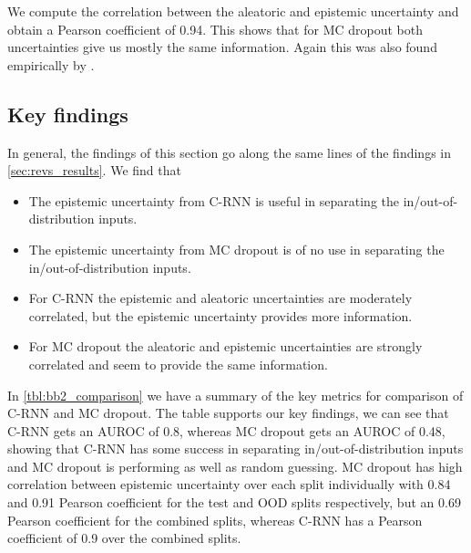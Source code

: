 We compute the correlation between the aleatoric and epistemic uncertainty and obtain a Pearson coefficient of 0.94. This shows that for MC dropout both uncertainties give us mostly the same information. Again this was also found empirically by \cite{kendall2017uncertainties}. 

\clearpage
\subsection{Key findings}

In general, the findings of this section go along the same lines of the findings in \cref{sec:revs_results}. We find that 

\begin{itemize}
    \item The epistemic uncertainty from C-RNN is useful in separating the in/out-of-distribution inputs.
    \item The epistemic uncertainty from MC dropout is of no use in separating the in/out-of-distribution inputs.
    \item For C-RNN the epistemic and aleatoric uncertainties are moderately correlated, but the epistemic uncertainty provides more information. 
    \item For MC dropout the aleatoric and epistemic uncertainties are strongly correlated and seem to provide the same information. 
\end{itemize}{}


In \cref{tbl:bb2_comparison} we have a summary of the key metrics for comparison of C-RNN and MC dropout. The table supports our key findings, we can see that C-RNN gets an AUROC of 0.8, whereas MC dropout gets an AUROC of 0.48, showing that C-RNN has some success in separating in/out-of-distribution inputs and MC dropout is performing as well as random guessing. MC dropout has high correlation between epistemic uncertainty over each split individually with 0.84 and 0.91 Pearson coefficient for the test and OOD splits respectively, but an 0.69 Pearson coefficient for the combined splits, whereas C-RNN has a Pearson coefficient of 0.9 over the combined splits.  

